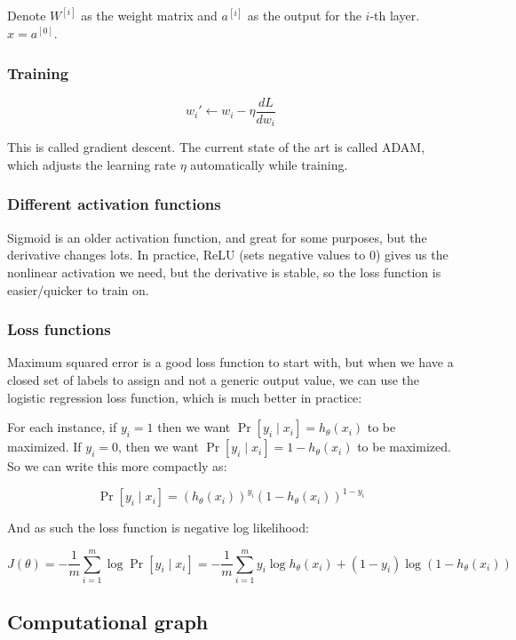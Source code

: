 \documentclass{idc_msc}
\begin{document}
Denote \(W^{[i]}\) as the weight matrix and \(a^{[i]}\) as the output for the \(i\)-th layer.
\(x = a^{[0]}\).

\subsubsection{Training}

\[w_i' \gets w_i - \eta \frac{dL}{dw_i}\]

This is called gradient descent.
The current state of the art is called ADAM, which adjusts the learning rate \(\eta\) automatically while training.

\subsubsection{Different activation functions}

Sigmoid is an older activation function, and great for some purposes, but the derivative changes lots.
In practice, ReLU (sets negative values to 0) gives us the nonlinear activation we need, but the derivative is stable, so the loss function is easier/quicker to train on.

\subsubsection{Loss functions}

Maximum squared error is a good loss function to start with, but when we have a closed set of labels to assign and not a generic output value, we can use the logistic regression loss function, which is much better in practice:

For each instance, if \(y_i = 1\) then we want \(\Pr[y_i \mid x_i] = h_{\theta}(x_{i})\) to be maximized.
If \(y_i = 0\), then we want \(\Pr[y_i \mid x_i] = 1 - h_{\theta}(x_i)\) to be maximized.
So we can write this more compactly as:

\[
  \Pr[y_i\mid x_i] = \left(h_{\theta}(x_i)\right)^{y_i} \left(1 - h_{\theta}(x_i)\right)^{1 - y_i}
\]

And as such the loss function is negative log likelihood:

\[
  J(\theta) = -\frac{1}{m} \sum_{i=1}^m \log \Pr[y_i \mid x_i] = - \frac{1}{m} \sum_{i=1}^m y_i \log h_{\theta}(x_i) + (1-y_i) \log (1-h_{\theta}(x_i))
\]

\subsection{Computational graph}
\end{document}
